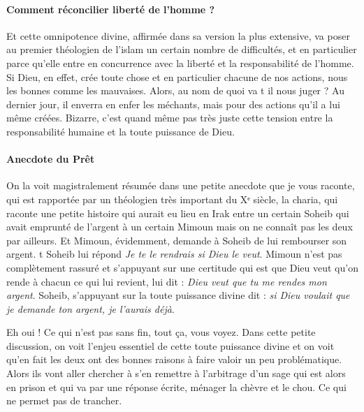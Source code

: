 \paragraph{Comment réconcilier liberté de l'homme ?}Et cette omnipotence divine, affirmée dans sa version la plus extensive, va poser au premier théologien de l'islam un certain nombre de difficultés, et en particulier parce qu'elle entre en concurrence avec la liberté et la responsabilité de l'homme.
Si Dieu, en effet, crée toute chose et en particulier chacune de nos actions, nous les bonnes comme les mauvaises. Alors, au nom de quoi va t il nous juger ? Au dernier jour, il enverra en enfer les méchants, mais pour des actions qu'il a lui même créées. Bizarre, c'est quand même pas très juste cette tension entre la responsabilité humaine et la toute puissance de Dieu.
\paragraph{Anecdote du Prêt}
On la voit magistralement résumée dans une petite anecdote que je vous raconte, qui est rapportée par un théologien très important du Xᵉ siècle, la charia, qui raconte une petite histoire qui aurait eu lieu en Irak entre un certain Soheib qui avait emprunté de l'argent à un certain Mimoun mais on ne connaît pas les deux par ailleurs. Et Mimoun, évidemment, demande à Soheib de lui rembourser son argent.
t Soheib lui répond \textit{Je te le rendrais si Dieu le veut}. Mimoun n'est pas complètement rassuré et s'appuyant sur une certitude qui est que Dieu veut qu'on rende à chacun ce qui lui revient, lui dit : \textit{Dieu veut que tu me rendes mon argent}. Soheib, s'appuyant sur la toute puissance divine dit : \textit{si Dieu voulait que je demande ton argent, je l'aurais déjà}.

Eh oui ! Ce qui n'est pas sans fin, tout ça, vous voyez. Dans cette petite discussion, on voit l'enjeu essentiel de cette toute puissance divine et on voit qu'en fait les deux ont des bonnes raisons à faire valoir un peu problématique. Alors ils vont aller chercher à s'en remettre à l'arbitrage d'un sage qui est alors en prison et qui va par une réponse écrite, ménager la chèvre et le chou. Ce qui ne permet pas de trancher. 

